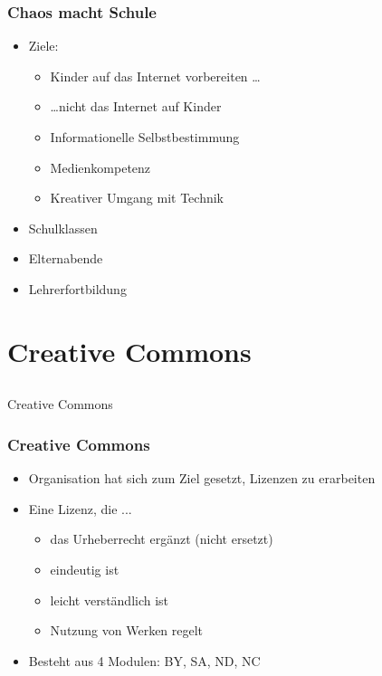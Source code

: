 \documentclass[table]{beamer}
\begin{document}
\begin{frame}
    \frametitle{Chaos macht Schule}
    \begin{itemize}
        \item<2->Ziele:
            \begin{itemize}
                \item<3-> Kinder auf das Internet vorbereiten \ldots
                \item<4-> \ldots nicht das Internet auf Kinder
                \item<5-> Informationelle Selbstbestimmung
                \item<6-> Medienkompetenz
                \item<7-> Kreativer Umgang mit Technik
            \end{itemize}
        \item<8-> Schulklassen
        \item<9-> Elternabende
        \item<10-> Lehrerfortbildung
    \end{itemize}
\end{frame}

\section{Creative Commons}
\subsection{}

\begin{frame}
    \begin{center}\Large
    Creative Commons
    \end {center}
\end{frame}

\begin{frame}
    \frametitle{Creative Commons}
    \begin{itemize}
        \item<2-> Organisation hat sich zum Ziel gesetzt, Lizenzen zu erarbeiten
        \item<3-> Eine Lizenz, die ...
            \begin{itemize}
                \item<4-> das Urheberrecht ergänzt (nicht ersetzt)
                \item<5-> eindeutig ist
                \item<6-> leicht verständlich ist
                \item<7-> Nutzung von Werken regelt
            \end{itemize}
        \item<8-> Besteht aus 4 Modulen: BY, SA, ND, NC
    \end{itemize}
\end{frame}
\end{document}
